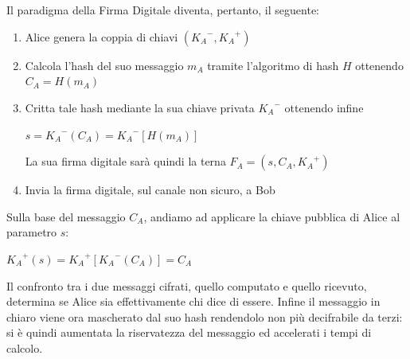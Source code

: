 \documentclass[a4paper,12pt]{tesiinfo}
\begin{document}
\\ 
\\
Il paradigma della Firma Digitale diventa, pertanto, il seguente: 
\begin{enumerate}
 \item Alice genera la coppia di chiavi $({K_A}^-, {K_A}^+)$
 \item Calcola l'hash del suo messaggio $m_A$ tramite l'algoritmo di hash $H$ ottenendo $C_A = H(m_A)$
 \item Critta tale hash mediante la sua chiave privata ${K_A}^-$ ottenendo infine
 \begin{center}
  $s = {K_A}^-(C_A) = {K_A}^-[H(m_A)]$
 \end{center}
 La sua firma digitale sar\`a quindi la terna $F_A = (s, C_A, {K_A}^+)$
 \item Invia la firma digitale, sul canale non sicuro, a Bob
\end{enumerate}
Sulla base del messaggio $C_A$, andiamo ad applicare la chiave pubblica di Alice al parametro $s$:
\begin{center}
 ${K_A}^+(s) = {K_A}^+[{K_A}^-(C_A)] = C_A$
\end{center}
Il confronto tra i due messaggi cifrati, quello computato e quello ricevuto, determina se Alice sia effettivamente chi dice di essere. Infine il messaggio in chiaro viene ora mascherato dal suo hash rendendolo non pi\`u decifrabile da terzi: si \`e quindi aumentata la riservatezza del messaggio ed accelerati i tempi di calcolo.
%
%
%
%
%
%
%
%
%
%
\end{document}
